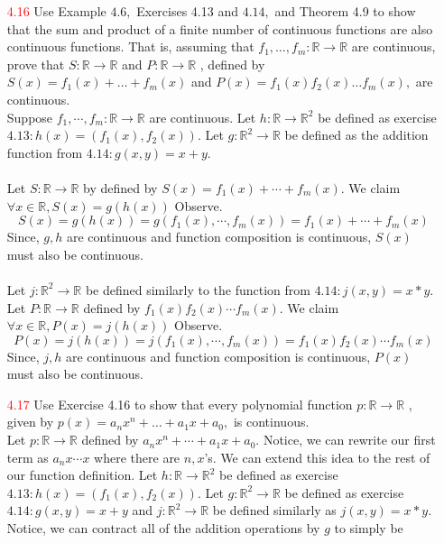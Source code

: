 \documentclass[12pt]{article}
\newcommand{\R}{\mathbb{R}}
\begin{document}
\begin{enumerate}
	\item[\textcolor{red}{4.16}] Use Example $4.6 ,$ Exercises 4.13 and $4.14 ,$ and Theorem 4.9 to show that the
	sum and product of a finite number of continuous functions are also continuous functions. That is, assuming that $f _ { 1 } , \ldots , f _ { m } : \mathbb { R } \rightarrow \mathbb { R }$ are continuous, prove that $S : \mathbb { R } \rightarrow \mathbb { R }$ and $P : \mathbb { R } \rightarrow \mathbb { R }$ , defined by $S ( x ) = f _ { 1 } ( x ) + \ldots + f _ { m } ( x )$ and $P ( x ) = f _ { 1 } ( x ) f _ { 2 } ( x ) \ldots f _ { m } ( x ) ,$ are continuous.\\
	Suppose $ f_1,\cdots,f_m :\R \rightarrow \R $ are continuous. Let $ h:\R\rightarrow\R^2  $ be defined as exercise $ 4.13: h(x)=(f_1(x),f_2(x))$. Let $ g:\R^2\rightarrow \R $ be defined as the addition function from $ 4.14: g(x,y)=x+y $. \\
	\\
	Let $ S:\R \rightarrow \R $ by defined by $ S(x)=f_1(x)+\cdots+f_m(x) $. We claim  $\forall x\in \R, S(x) = g(h(x)) $ Observe.
	\[S(x)= g(h(x))=g(f_1(x),\cdots,f_m(x))=f_1(x)+\cdots+f_m(x)\]
	Since, $ g,h $ are continuous and function composition is continuous, $ S(x)$ must also be continuous.\\
	\\
	Let $ j:\R^2\rightarrow \R $ be defined similarly to the function from $ 4.14: j(x,y)=x*y$. Let $ P:\R\rightarrow\R $ defined by $ f_1(x)f_2(x)\cdots f_m(x) $. We claim  $\forall x\in \R, P(x)=j(h(x)) $ Observe.
		\[P(x)= j(h(x))=j(f_1(x),\cdots,f_m(x))=f_1(x)f_2(x)\cdots f_m(x)\]
	Since, $ j,h $ are continuous and function composition is continuous, $ P(x)$ must also be continuous.\\
	\item[\textcolor{red}{4.17}] Use Exercise 4.16 to show that every polynomial function $p : \mathbb { R } \rightarrow \mathbb { R }$ , given by $p ( x ) = a _ { n } x ^ { n } + \ldots + a _ { 1 } x + a _ { 0 } ,$ is continuous.\\
	Let $ p : \R \rightarrow \R $ defined by $ a_nx^n+\cdots+a_1x+a_0 $. Notice, we can rewrite our first term as $ a_nx\cdots x $ where there are $ n, x$'s. We can extend this idea to the rest of our function definition. Let $ h:\R\rightarrow\R^2  $ be defined as exercise $ 4.13: h(x)=(f_1(x),f_2(x))$. Let $ g:\R^2 \rightarrow \R $ be defined as exercise $ 4.14: g(x,y)=x+y $ and $ j:\R^2\rightarrow \R $ be defined similarly as $j(x,y)=x*y $.\\
	Notice, we can contract all of the addition operations by $ g $ to simply be 

\end{enumerate}
\end{document}

